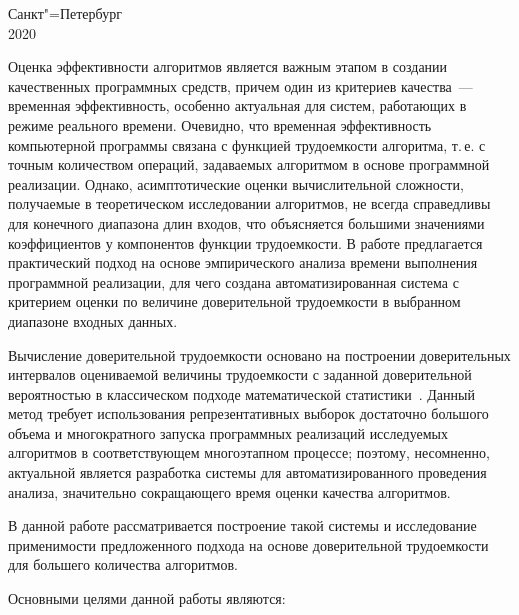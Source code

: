 \documentclass[a4paper, article, 14pt]{extarticle}
\begin{document}
\begin{center}
	Санкт"=Петербург\\
	2020
\end{center}
\thispagestyle{empty} %


\newpage

\tableofcontents

\newpage

\label{sec:introduction}

Оценка эффективности алгоритмов является важным этапом в создании качественных программных средств, причем один из критериев качества~--- временная эффективность, особенно актуальная для систем, работающих в режиме реального времени. Очевидно, что временная эффективность компьютерной программы связана с функцией трудоемкости алгоритма, т.\,е. с точным количеством операций, задаваемых алгоритмом в основе программной реализации. Однако, асимптотические оценки вычислительной сложности, получаемые в теоретическом исследовании алгоритмов, не всегда справедливы для конечного диапазона длин входов, что объясняется большими значениями коэффициентов у компонентов функции трудоемкости. В работе предлагается практический подход на основе эмпирического анализа времени выполнения программной реализации, для чего создана автоматизированная система с критерием оценки по величине доверительной трудоемкости в выбранном диапазоне входных данных.

Вычисление доверительной трудоемкости основано на построении доверительных интервалов оцениваемой величины трудоемкости с заданной доверительной вероятностью в классическом подходе математической статистики~\cite{petrushyn_ulyanov_analysis}. Данный метод требует использования репрезентативных выборок достаточно большого объема и многократного запуска программных реализаций исследуемых алгоритмов в соответствующем многоэтапном процессе; поэтому, несомненно, актуальной является разработка системы для автоматизированного проведения анализа, значительно сокращающего время оценки качества алгоритмов.

В данной работе рассматривается построение такой системы и исследование применимости предложенного подхода на основе доверительной трудоемкости для большего количества алгоритмов.

\label{sec:problem_statement}

Основными целями данной работы являются:
\end{document}
